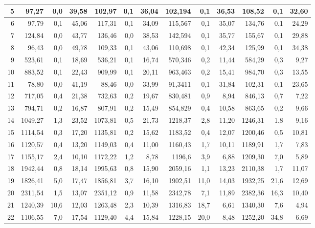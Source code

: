 {\begin{table}[H]
\begin{tabular}{|r|rrr|rrr|rrr|rrr|}
		5	&	97,27	&	0,0	&	39,58	&	102,97	&	0,1	&	36,04	&	102,194	&	0,1	&	36,53	&	108,52	&	0,1	&	32,60	\\ \hline
		6	&	97,79	&	0,1	&	45,06	&	117,31	&	0,1	&	34,09	&	115,567	&	0,1	&	35,07	&	134,76	&	0,1	&	24,29	\\ \hline
		7	&	124,84	&	0,0	&	43,77	&	136,46	&	0,0	&	38,53	&	142,594	&	0,1	&	35,77	&	155,67	&	0,1	&	29,88	\\ \hline
		8	&	96,43	&	0,0	&	49,78	&	109,33	&	0,1	&	43,06	&	110,698	&	0,1	&	42,34	&	125,99	&	0,1	&	34,38	\\ \hline
		9	&	523,61	&	0,1	&	18,69	&	536,21	&	0,1	&	16,74	&	570,346	&	0,2	&	11,44	&	584,29	&	0,3	&	9,27	\\ \hline
		10	&	883,52	&	0,1	&	22,43	&	909,99	&	0,1	&	20,11	&	963,463	&	0,2	&	15,41	&	984,70	&	0,3	&	13,55	\\ \hline
		11	&	78,80	&	0,0	&	41,19	&	88,46	&	0,0	&	33,99	&	91,3411	&	0,1	&	31,84	&	102,31	&	0,1	&	23,65	\\ \hline
		12	&	717,05	&	0,4	&	21,38	&	732,63	&	0,2	&	19,67	&	830,481	&	0,9	&	8,94	&	846,13	&	0,7	&	7,22	\\ \hline
		13	&	794,71	&	0,2	&	16,87	&	807,91	&	0,2	&	15,49	&	854,829	&	0,4	&	10,58	&	863,65	&	0,2	&	9,66	\\ \hline
		14	&	1049,27	&	1,3	&	23,52	&	1073,81	&	0,5	&	21,73	&	1218,37	&	2,8	&	11,20	&	1246,31	&	1,8	&	9,16	\\ \hline
		15	&	1114,54	&	0,3	&	17,20	&	1135,81	&	0,2	&	15,62	&	1183,52	&	0,4	&	12,07	&	1200,46	&	0,5	&	10,81	\\ \hline
		16	&	1120,57	&	0,4	&	13,20	&	1149,03	&	0,4	&	11,00	&	1160,43	&	1,7	&	10,11	&	1189,91	&	1,7	&	7,83	\\ \hline
		17	&	1155,17	&	2,4	&	10,10	&	1172,22	&	1,2	&	8,78	&	1196,6	&	3,9	&	6,88	&	1209,30	&	7,0	&	5,89	\\ \hline
		18	&	1942,44	&	0,8	&	18,14	&	1995,63	&	0,8	&	15,90	&	2059,16	&	1,1	&	13,23	&	2110,38	&	1,7	&	11,07	\\ \hline
		19	&	1826,41	&	5,0	&	17,47	&	1856,81	&	3,7	&	16,10	&	1902,51	&	11,0	&	14,03	&	1932,25	&	21,6	&	12,69	\\ \hline
		20	&	2311,54	&	1,5	&	13,07	&	2351,12	&	0,9	&	11,58	&	2342,78	&	7,1	&	11,89	&	2382,36	&	16,3	&	10,40	\\ \hline
		21	&	1240,39	&	10,6	&	12,03	&	1263,48	&	2,3	&	10,39	&	1316,83	&	18,7	&	6,61	&	1340,30	&	7,6	&	4,94	\\ \hline
		22	&	1106,55	&	7,0	&	17,54	&	1129,40	&	4,4	&	15,84	&	1228,15	&	20,0	&	8,48	&	1252,20	&	34,8	&	6,69	\\ \hline

\end{tabular}
\end{table}}
